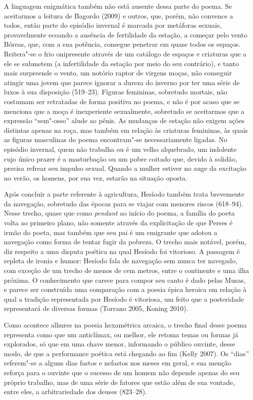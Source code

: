 A linguagem enigmática também não está ausente dessa parte do poema. Se
aceitarmos a leitura de Bagordo (2009) e outros, que, porém, não
convence a todos, então parte do episódio invernal é marcada por
metáforas sexuais, provavelmente ecoando a ausência de fertilidade da
estação, a começar pelo vento Bóreas, que, com a sua potência, consegue
penetrar em quase todos os espaços. Reitera"-se o frio onipresente
através de um catálogo de espaços e criaturas que a ele se submetem (a
infertilidade da estação por meio do seu contrário), e tanto mais
surpreende o vento, um notório raptor de virgens moças, não conseguir
atingir uma jovem que parece ignorar a dureza do inverno por ter uma
série de luxos à sua disposição (519--23). Figuras femininas, sobretudo
mortais, não costumam ser retratadas de forma positiva no poema, e não é
por acaso que se menciona que a moça é inexperiente sexualmente,
sobretudo se aceitarmos que a expressão ``sem"-osso'' alude ao pênis. As
mudanças de estação não exigem ações distintas apenas na roça, mas
também em relação às criaturas femininas, às quais as figuras masculinas
do poema encontram"-se necessariamente ligadas. No episódio invernal,
quem não trabalha ou é um velho alquebrado, um indolente cujo único
prazer é a masturbação ou um pobre coitado que, devido à solidão,
precisa refrear seu impulso sexual. Quando a mulher estiver no auge da
excitação no verão, os homens, por sua vez, estarão na situação oposta.

Após concluir a parte referente à agricultura, Hesíodo também trata
brevemente da navegação, sobretudo das épocas para se viajar com menores
riscos (618--94). Nesse trecho, quase que como \emph{pendant} ao início
do poema, a família do poeta volta ao primeiro plano, não somente
através da explicitação de que Perses é irmão do poeta, mas também que
seu pai é um emigrante que adotou a navegação como forma de tentar fugir
da pobreza. O trecho mais notável, porém, diz respeito a uma disputa
poética na qual Hesíodo foi vitorioso. A passagem é repleta de ironia e
humor: Hesíodo fala de navegação sem nunca ter navegado, com exceção de
um trecho de menos de cem metros, entre o continente e uma ilha próxima.
O conhecimento que carece para compor seu canto é dado pelas Musas, e
parece ser construída uma comparação com a poesia épica heroica em
relação à qual a tradição representada por Hesíodo é vitoriosa, um feito
que a posteridade representará de diversas formas (Torrano 2005, Koning
2010).

Como acontece alhures na poesia hexamétrica arcaica, o trecho final
desse poema representa como que um anticlímax, ou melhor, ele retoma
temas ou formas já explorados, só que em uma chave menor, informando o
público ouvinte, desse modo, de que a performance poética está chegando
ao fim (Kelly 2007). Os ``dias'' referem"-se a alguns dias fastos e
nefastos nos meses em geral, e sua menção reforça para o ouvinte que o
sucesso de um homem não depende apenas do seu próprio trabalho, mas de
uma série de fatores que estão além de sua vontade, entre eles, a
arbitrariedade dos deuses (823--28).


